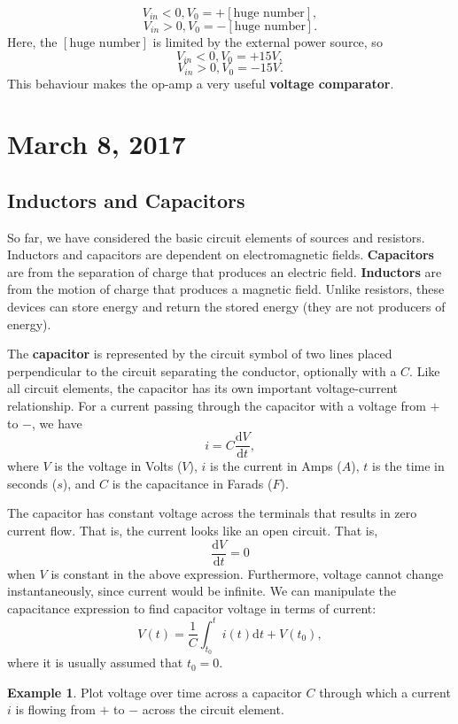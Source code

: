 \documentclass[11pt]{article}
\theoremstyle{plain} %
\theoremstyle{definition}
\theoremstyle{example}
\newtheorem*{example}{Example}
\theoremstyle{remark}
\begin{document}
$$V_{in} < 0, V_0 = +[\text{huge number}],$$
$$V_{in} > 0, V_0 = -[\text{huge number}].$$
Here, the $[\text{huge number}]$ is limited by the external power source, so 
$$V_{in} < 0, V_0 = +15V,$$
$$V_{in} >0, V_0 = -15V.$$
This behaviour makes the op-amp a very useful \textbf{voltage comparator}.




\section{March 8, 2017}
\subsection{Inductors and Capacitors}

So far, we have considered the basic circuit elements of sources and resistors. Inductors and capacitors are dependent on electromagnetic fields. \textbf{Capacitors} are from the separation of charge that produces an electric field. \textbf{Inductors} are from the motion of charge that produces a magnetic field. Unlike resistors, these devices can store energy and return the stored energy (they are not producers of energy). 

The \textbf{capacitor} is represented by the circuit symbol of two lines placed perpendicular to the circuit separating the conductor, optionally with a $C$. Like all circuit elements, the capacitor has its own important voltage-current relationship. For a current passing through the capacitor with a voltage from $+$ to $-$, we have 
$$i = C\frac{\mathrm d V}{\mathrm d t},$$
where $V$ is the voltage in Volts ($V$), $i$ is the current in Amps ($A$), $t$ is the time in seconds ($s$), and $C$ is the capacitance in Farads ($F$). 

The capacitor has constant voltage across the terminals that results in zero current flow. That is, the current looks like an open circuit. That is, 
$$\frac{\mathrm d V}{\mathrm d t} = 0$$ when $V$ is constant in the above expression. Furthermore, voltage cannot change instantaneously, since current would be infinite. We can manipulate the capacitance expression to find capacitor voltage in terms of current:
$$V(t) = \frac{1}{C}\int_{t_0}^ti(t)\mathrm d t + V(t_0),$$
where it is usually assumed that $t_0=0$. 

\begin{example}
Plot voltage over time across a capacitor $C$ through which a current $i$ is flowing from $+$ to $-$ across the circuit element. 
\end{example}
\end{document}

